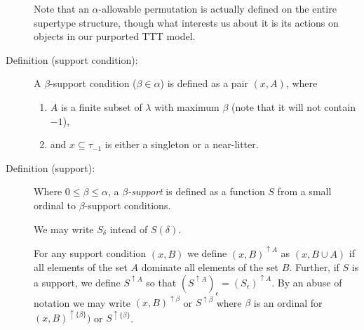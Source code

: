 \documentclass[112pt]{article}
\begin{document}
\begin{description}
Note that an $\alpha$-allowable permutation is actually defined on the entire supertype structure, though what interests us about it is its actions on objects in our purported TTT model.






\item[Definition (support condition):]  A $\beta$-support condition ($\beta \in \alpha$) is defined as a pair $(x,A)$, where 
\begin{enumerate}

\item $A$ is a finite subset of $\lambda$  with maximum $\beta$ (note that it will not contain $-1$), 

\item and $x\subseteq \tau_{-1}$ is either a singleton or a near-litter.

\end{enumerate}

\item[Definition (support):]  Where $0\leq\beta \leq \alpha$, a {\em $\beta$-support\/} is defined as a function $S$ from a small ordinal to $\beta$-support conditions.

   We may write $S_\delta$ intead of $S(\delta)$.

For any support condition $(x,B)$ we define $(x,B)^{\uparrow A}$ as $(x,B\cup A)$ if all elements of the set $A$ dominate all elements of the set $B$.
Further, if $S$ is a support, we define $S^{\uparrow A}$ so that $(S^{\uparrow A})_\epsilon = (S_\epsilon)^{\uparrow A}$.  By an abuse of notation we may write $(x,B)^{\uparrow \beta}$ or $S^{\uparrow \beta}$ where $\beta$ is an ordinal for $(x,B)^{\uparrow \{\beta\}})$ or $S^{\uparrow \{\beta\}}$.

\begin{comment}

We make the formal requirement on supports
that if the range of a support contains $(x,A)$ and $(y,A)$ where $x,y$ are typed near-litters and either $(x \Delta y)\cap \tau_{-1}$ or $(x \cap y) \cap \tau_{-1}$ is small, that all $(z,A)$ with $z\cap \tau_{-1}$ a singleton subset of this small set are included in the range of the support.

For any supports $S$ and $T$ we denote by $S+T$ a support which consists
of $S$, followed by $T$, followed by the atoms which need to be added to make this a support (to make it satisfy the additional condition):  what this means is that $(S+T)_\epsilon = S(\epsilon)$ [which we write $S_\epsilon$] for $\epsilon$ in the domain of $S$, $(S+T)_{{\tt dom}(S)+\epsilon} = T_\epsilon$ for $\epsilon$ in the domain of $T$, and the rest of the range of $S+T$ consists of the support conditions with atomic first component  which must be added to satisfy the additional condition [this is not uniquely determined:  supports usually have many possible sums because the needed additional conditions can be added in any order.]
\end{comment}


\end{description}
\end{document}
